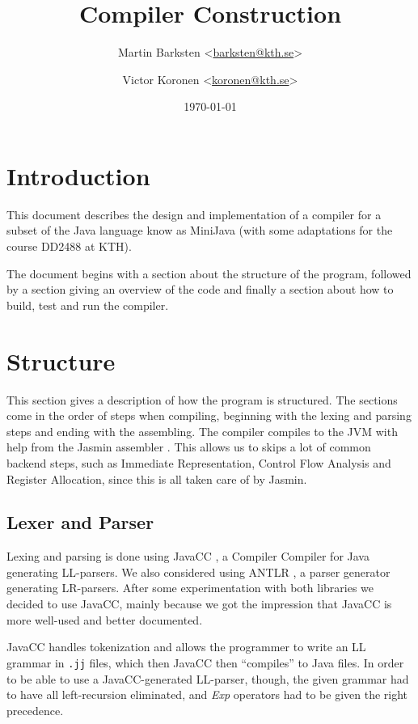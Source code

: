 \documentclass[a4paper]{article}
\title{Compiler Construction}
\author{%
    Martin Barksten <\href{mailto:barksten@kth.se}{barksten@kth.se}> \and
    Victor Koronen <\href{mailto:koronen@kth.se}{koronen@kth.se}>
}
\date{\today}
\begin{document}
\maketitle
\thispagestyle{empty}

\section{Introduction}

This document describes the design and implementation of a compiler for a subset
of the Java language know as MiniJava \cite{minijavaproject} (with some
adaptations \cite{dd2488project} for the course DD2488 at KTH).

The document begins with a section about the structure of the program, followed
by a section giving an overview of the code and finally a section about how to
build, test and run the compiler.

\section{Structure}

This section gives a description of how the program is structured. The sections
come in the order of steps when compiling, beginning with the lexing and parsing
steps and ending with the assembling. The compiler compiles to the JVM with help
from the Jasmin assembler \cite{jasmin}. This allows us to skips a lot of common
backend steps, such as Immediate Representation, Control Flow Analysis and
Register Allocation, since this is all taken care of by Jasmin.

\subsection{Lexer and Parser}

Lexing and parsing is done using JavaCC \cite{javacc}, a Compiler Compiler for
Java generating LL-parsers. We also considered using ANTLR \cite{antlr}, a
parser generator generating LR-parsers. After some experimentation with both
libraries we decided to use JavaCC, mainly because we got the impression that
JavaCC is more well-used and better documented.

JavaCC handles tokenization and allows the programmer to write an LL grammar in
\texttt{.jj} files, which then JavaCC then ``compiles'' to Java files. In order
to be able to use a JavaCC-generated LL-parser, though, the given grammar had to
have all left-recursion eliminated, and \textit{Exp} operators had to be given the
right precedence.
\end{document}
